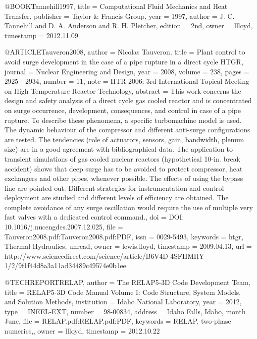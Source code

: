 {{@BOOK{Tannehill1997,
  title = {Computational Fluid Mechanics and Heat Transfer},
  publisher = {Taylor \& Francis Group},
  year = {1997},
  author = {J. C. Tannehill and D. A. Anderson and R. H. Pletcher},
  edition = {2nd},
  owner = {llloyd},
  timestamp = {2012.11.09}
}

@ARTICLE{Tauveron2008,
  author = {Nicolas Tauveron},
  title = {Plant control to avoid surge development in the case of a pipe rupture
	in a direct cycle HTGR},
  journal = {Nuclear Engineering and Design},
  year = {2008},
  volume = {238},
  pages = {2925 - 2934},
  number = {11},
  note = {HTR-2006: 3rd International Topical Meeting on High Temperature Reactor
	Technology},
  abstract = {This work concerns the design and safety analysis of a direct cycle
	gas cooled reactor and is concentrated on surge occurrence, development,
	consequences, and control in case of a pipe rupture. To describe
	these phenomena, a specific turbomachine model is used. The dynamic
	behaviour of the compressor and different anti-surge configurations
	are tested. The tendencies (role of actuators, sensors, gain, bandwidth,
	plenum size) are in a good agreement with bibliographical data. The
	application to transient simulations of gas cooled nuclear reactors
	(hypothetical 10-in. break accident) shows that deep surge has to
	be avoided to protect compressor, heat exchangers and other pipes,
	whenever possible. The effects of using the bypass line are pointed
	out. Different strategies for instrumentation and control deployment
	are studied and different levels of efficiency are obtained. The
	complete avoidance of any surge oscillation would require the use
	of multiple very fast valves with a dedicated control command.},
  doi = {DOI: 10.1016/j.nucengdes.2007.12.025},
  file = {Tauveron2008.pdf:Tauveron2008.pdf:PDF},
  issn = {0029-5493},
  keywords = {htgr, Thermal Hydraulics, unread},
  owner = {lewis.lloyd},
  timestamp = {2009.04.13},
  url = {http://www.sciencedirect.com/science/article/B6V4D-4SFHMHY-1/2/9f1f44d8a3a11ad34489c49574e0b1ee}
}

@TECHREPORT{RELAP,
  author = {{The RELAP5-3D Code Development Team}},
  title = {{RELAP5-3D} Code Manual Volume {I}: Code Structure, System Models,
	and Solution Methods},
  institution = {Idaho National Laboratory},
  year = {2012},
  type = {INEEL-EXT},
  number = {98-00834},
  address = {Idaho Falls, Idaho},
  month = {June},
  file = {RELAP.pdf:RELAP.pdf:PDF},
  keywords = {RELAP, two-phase numerics,},
  owner = {llloyd},
  timestamp = {2012.10.22}
}

}}
